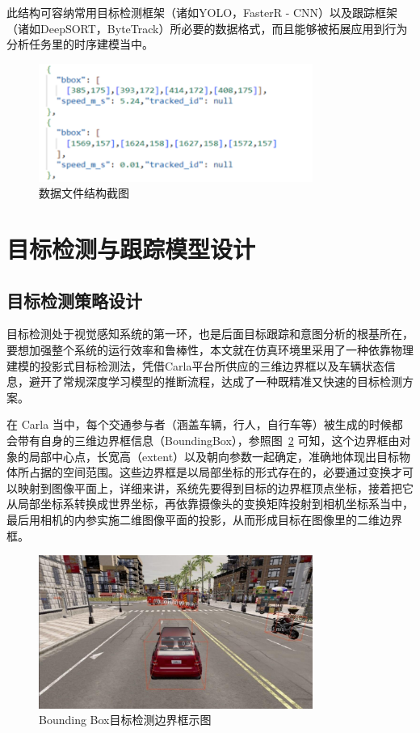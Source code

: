 此结构可容纳常用目标检测框架（诸如YOLO，FasterR - CNN）以及跟踪框架（诸如DeepSORT，ByteTrack）所必要的数据格式，而且能够被拓展应用到行为分析任务里的时序建模当中。

\begin{figure}[H]
    \centering
    \includegraphics[width=0.8\textwidth]{images/图8 数据文件结构截图.pdf}  %
    \caption{数据文件结构截图}
    \label{fig:example_image}  %
\end{figure}

\section{目标检测与跟踪模型设计}

\subsection{目标检测策略设计}

目标检测处于视觉感知系统的第一环，也是后面目标跟踪和意图分析的根基所在，要想加强整个系统的运行效率和鲁棒性，本文就在仿真环境里采用了一种依靠物理建模的投影式目标检测法，凭借Carla平台所供应的三维边界框以及车辆状态信息，避开了常规深度学习模型的推断流程，达成了一种既精准又快速的目标检测方案。

在 Carla 当中，每个交通参与者（涵盖车辆，行人，自行车等）被生成的时候都会带有自身的三维边界框信息（BoundingBox），参照图~\ref{fig:Bounding} 可知，这个边界框由对象的局部中心点，长宽高（extent）以及朝向参数一起确定，准确地体现出目标物体所占据的空间范围。这些边界框是以局部坐标的形式存在的，必要通过变换才可以映射到图像平面上，详细来讲，系统先要得到目标的边界框顶点坐标，接着把它从局部坐标系转换成世界坐标，再依靠摄像头的变换矩阵投射到相机坐标系当中，最后用相机的内参实施二维图像平面的投影，从而形成目标在图像里的二维边界框。

\begin{figure}[H]
    \centering
    \includegraphics[width=0.8\textwidth]{images/图9 Bounding Box目标检测边界框示图.pdf}  %
    \caption{Bounding Box目标检测边界框示图}
    \label{fig:Bounding}  %
\end{figure}


